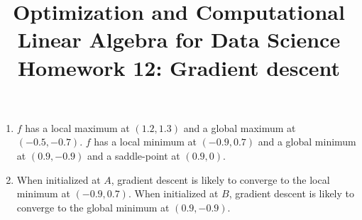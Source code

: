 \documentclass[11pt,nocut]{article}
\title{\vspace{-2.0cm}%
	Optimization and Computational Linear Algebra for Data Science\\
Homework 12: Gradient descent}
\date{}
\begin{document}
\maketitle
%


\begin{problem}[2 points] 
	\begin{enumerate}[label=\normalfont(\textbf{\alph*})]
		\item $f$ has a local maximum at $(1.2,1.3)$ and a global maximum at $(-0.5,-0.7)$. $f$ has a local minimum at $(-0.9,0.7)$ and a global minimum at $(0.9,-0.9)$ and a saddle-point at $(0.9,0)$.
		\item When initialized at $A$, gradient descent is likely to converge to the local minimum at $(-0.9,0.7)$. When initialized at $B$, gradient descent is likely to converge to the global minimum at $(0.9,-0.9)$.
	\end{enumerate}
\end{problem}

\vspace{5mm}
\end{document}

